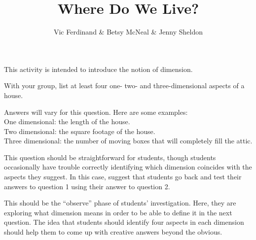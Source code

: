 \documentclass{ximera}
\title{Where Do We Live?}
\author{Vic Ferdinand \& Betsy McNeal \& Jenny Sheldon}
\begin{document}
\begin{abstract}
\end{abstract}


\maketitle

\begin{instructorIntro}
    This activity is intended to introduce the notion of dimension.  
    
    
\end{instructorIntro}

\begin{problem}
    With your group, list at least four one- two- and three-dimensional aspects of a house.
    
    \begin{solution}
        Answers will vary for this question.  Here are some examples:\\
        One dimensional: the length of the house.\\
        Two dimensional: the square footage of the house.\\
        Three dimensional: the number of moving boxes that will completely fill the attic.
    \end{solution}
    
    \begin{instructorNotes}
        This question should be straightforward for students, though students occasionally have trouble correctly identifying which dimension coincides with the aspects they suggest.  In this case, suggest that students go back and test their answers to question 1 using their answer to question 2.
        
        This should be the ``observe'' phase of students' investigation.  Here, they are exploring what dimension means in order to be able to define it in the next question.  The idea that students should identify four aspects in each dimension should help them to come up with creative answers beyond the obvious.
    \end{instructorNotes}
\end{problem}
\end{document}
